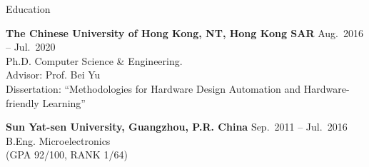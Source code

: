 

\begin{rSection}{Education}

{\bf The Chinese University of Hong Kong, NT, Hong Kong SAR} \hfill { Aug.~2016 -- Jul.~2020}\\
Ph.D. \quad Computer Science \& Engineering. \\
Advisor: Prof. Bei Yu \\
Dissertation: ``Methodologies for Hardware Design Automation and Hardware-friendly Learning''

{\bf Sun Yat-sen University, Guangzhou, P.R. China} \hfill { Sep.~2011 -- Jul.~2016}\\
B.Eng. \quad Microelectronics \\
(GPA 92/100, RANK 1/64) 
\end{rSection}

